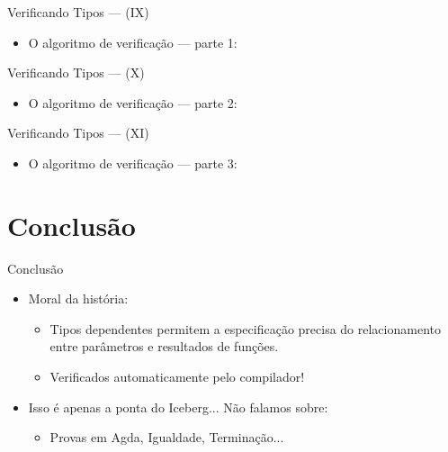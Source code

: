 \documentclass{beamer}
\begin{document}
       \begin{frame}{Verificando Tipos --- (IX)}
         \begin{itemize}
           \item O algoritmo de verifica\c{c}\~ao --- parte 1:
         \end{itemize}
       \end{frame}

       \begin{frame}{Verificando Tipos --- (X)}
         \begin{itemize}
           \item O algoritmo de verifica\c{c}\~ao --- parte 2:
         \end{itemize}
       \end{frame}


        \begin{frame}{Verificando Tipos --- (XI)}
         \begin{itemize}
           \item O algoritmo de verifica\c{c}\~ao --- parte 3:
         \end{itemize}
         \begin{flushleft}
         \end{flushleft}
       \end{frame}

       \section{Conclus\~ao}
       \begin{frame}{Conclus\~ao}
         \begin{itemize}
           \item Moral da hist\'oria:
           \begin{itemize}
             \item Tipos dependentes permitem a especifica\c{c}\~ao precisa do relacionamento entre par\^ametros e
                   resultados de fun\c{c}\~oes.
             \item Verificados automaticamente pelo compilador!
           \end{itemize}
           \item Isso \'e apenas a ponta do Iceberg... N\~ao falamos sobre:
           \begin{itemize}
             \item Provas em Agda, Igualdade, Termina\c{c}\~ao...
           \end{itemize}
         \end{itemize}
       \end{frame}

    
\end{document}
